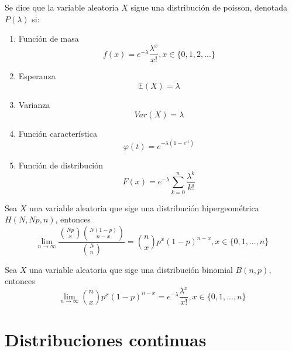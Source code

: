 \begin{defn}[Poisson]
Se dice que la variable aleatoria $X$ sigue una distribución de poisson, denotada $P(\lambda)$ si:
\begin{enumerate}[label=(\roman*)]
    \item Función de masa \[ f(x) = e^{-\lambda}\frac{\lambda^x}{x!}, x\in\{0,1,2,...\} \]
    \item Esperanza \[ \mathbb{E}(X) = \lambda \]
    \item Varianza \[ Var(X) = \lambda \]
    \item Función característica \[ \varphi(t) = e^{-\lambda(1-e^{it})} \]
    \item Función de distribución \[ F(x) = e^{-\lambda}\sum_{k=0}^n \frac{\lambda^k}{k!}\]
\end{enumerate}
\end{defn}

\begin{ejr}[2.19 , Schaum]

\end{ejr}

\begin{ejr}[2.31 , Schaum]

\end{ejr}

\begin{theo}
Sea $X$ una variable aleatoria que sige una distribución hipergeométrica $H(N,Np,n)$, entonces \[ \lim_{n\rightarrow\infty}  \frac{\binom{Np}{x}\binom{N(1-p)}{n-x}}{\binom{N}{n}} = \binom{n}{x}p^x(1-p)^{n-x}, x\in\{0,1,...,n\} \]
\end{theo}

\begin{theo}
Sea $X$ una variable aleatoria que sige una distribución binomial $B(n,p)$, entonces \[ \lim_{n\rightarrow\infty} \binom{n}{x}p^x(1-p)^{n-x} = e^{-\lambda}\frac{\lambda^x}{x!}, x\in\{0,1,...,n\}\]
\end{theo}

\begin{ejr}

\end{ejr}

\begin{ejr}[2.43 , Schaum]

\end{ejr}

\section{Distribuciones continuas}

